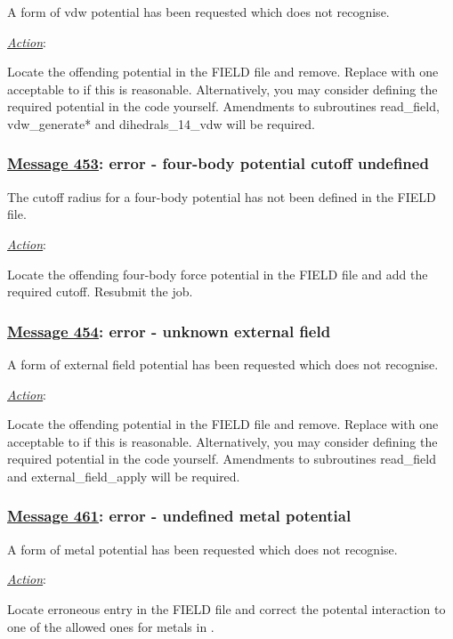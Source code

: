 A form of vdw potential has been requested which \D does not
recognise.

\noindent \underline{\em Action}:

Locate the offending potential in the FIELD file and remove.
Replace with one acceptable to \D if this is reasonable.
Alternatively, you may consider defining the required potential in
the code yourself.  Amendments to subroutines {\sc read\_field},
{\sc vdw\_generate}* and {\sc dihedrals\_14\_vdw} will be required.

\subsubsection*{\underline{Message 453}: error - four-body potential cutoff undefined}

The cutoff radius for a four-body
potential has not been defined in the FIELD file.

\noindent \underline{\em Action}:

Locate the offending four-body force potential in the FIELD file
and add the required cutoff.  Resubmit the job.

\subsubsection*{\underline{Message 454}: error - unknown external field}

A form of external field potential has been requested which \D
does not recognise.

\noindent \underline{\em Action}:

Locate the offending potential in the FIELD file and remove.
Replace with one acceptable to \D if this is reasonable.
Alternatively, you may consider defining the required potential in
the code yourself.  Amendments to subroutines {\sc read\_field}
and {\sc external\_field\_apply} will be required.

\subsubsection*{\underline{Message 461}: error - undefined metal potential}

A form of metal potential has been requested which \D does not
recognise.

\noindent \underline{\em Action}:

Locate erroneous entry in the FIELD file and correct the potental
interaction to one of the allowed ones for metals in \D.

